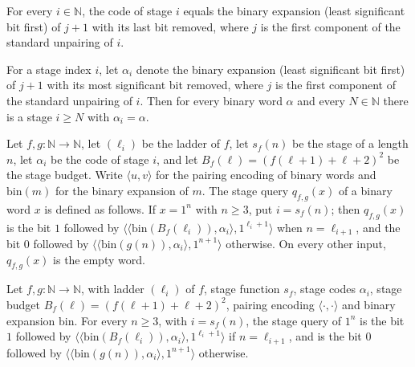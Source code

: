 \begin{theorem}
\label{Turing.NTimeDiag.stageCode_eq}
\leanok
{}
For every $i \in \mathbb{N}$, the code of stage $i$ equals the binary expansion (least
significant bit first) of $j + 1$ with its last bit removed, where $j$ is the first component
of the standard unpairing of $i$.
\end{theorem}

\begin{theorem}
\label{Turing.NTimeDiag.stageCode_frequently}
\leanok
{}
For a stage index $i$, let $\alpha_i$ denote the binary expansion (least significant bit first)
of $j + 1$ with its most significant bit removed, where $j$ is the first component of the
standard unpairing of $i$. Then for every binary word $\alpha$ and every $N \in \mathbb{N}$
there is a stage $i \ge N$ with $\alpha_i = \alpha$.
\end{theorem}

\begin{definition}
\label{Turing.NTimeDiag.query}
\leanok
{}
Let $f, g : \mathbb{N} \to \mathbb{N}$, let $(\ell_i)$ be the ladder of $f$, let $s_f(n)$ be the
stage of a length $n$, let $\alpha_i$ be the code of stage $i$, and let
$B_f(\ell) = (f(\ell+1) + \ell + 2)^2$ be the stage budget. Write $\langle u, v \rangle$ for the
pairing encoding of binary words and $\mathrm{bin}(m)$ for the binary expansion of $m$. The stage
query $q_{f,g}(x)$ of a binary word $x$ is defined as follows. If $x = 1^n$ with $n \ge 3$, put
$i = s_f(n)$; then $q_{f,g}(x)$ is the bit $1$ followed by
$\langle\langle \mathrm{bin}(B_f(\ell_i)), \alpha_i\rangle, 1^{\ell_i + 1}\rangle$ when
$n = \ell_{i+1}$, and the bit $0$ followed by
$\langle\langle \mathrm{bin}(g(n)), \alpha_i\rangle, 1^{n + 1}\rangle$ otherwise. On every other
input, $q_{f,g}(x)$ is the empty word.
\end{definition}

\begin{theorem}
\label{Turing.NTimeDiag.query_eq}
\leanok
{}
Let $f, g : \mathbb{N} \to \mathbb{N}$, with ladder $(\ell_i)$ of $f$, stage function $s_f$,
stage codes $\alpha_i$, stage budget $B_f(\ell) = (f(\ell+1) + \ell + 2)^2$, pairing encoding
$\langle \cdot, \cdot \rangle$ and binary expansion $\mathrm{bin}$. For every $n \ge 3$, with
$i = s_f(n)$, the stage query of $1^n$ is the bit $1$ followed by
$\langle\langle \mathrm{bin}(B_f(\ell_i)), \alpha_i\rangle, 1^{\ell_i+1}\rangle$ if
$n = \ell_{i+1}$, and is the bit $0$ followed by
$\langle\langle \mathrm{bin}(g(n)), \alpha_i\rangle, 1^{n+1}\rangle$ otherwise.
\end{theorem}

